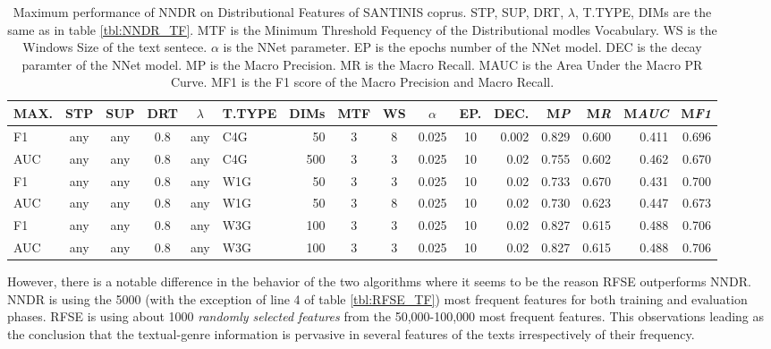 \documentclass[runningheads]{llncs}
\begin{document}
\begin{table}
\center
\begin{tabular}{|l|cccc|lr|ccccr|rrrr|}
\hline
MAX. & STP & SUP & DRT & $\lambda$ & T.TYPE & DIMs & MTF & WS & $\alpha$ & EP. & DEC. & M\emph{P} & M\emph{R} & M\emph{AUC} & M\emph{F1} \\
\hline
F1 & any & any & 0.8 & any & C4G & 50 & 3 & 8 & 0.025 & 10 & 0.002 & 0.829 & 0.600 & 0.411 & 0.696 \\
AUC & any & any & 0.8 & any & C4G & 500 & 3 & 3 & 0.025 & 10 & 0.02 & 0.755 & 0.602 & 0.462 & 0.670 \\
F1 & any & any & 0.8 & any & W1G & 50 & 3 & 3 & 0.025 & 10 & 0.02 & 0.733 & 0.670 & 0.431 & 0.700 \\
AUC & any & any & 0.8 & any & W1G & 50 & 3 & 8 & 0.025 & 10 & 0.02 & 0.730 & 0.623 & 0.447 & 0.673 \\
F1 & any & any & 0.8 & any & W3G & 100 & 3 & 3 & 0.025 & 10 & 0.02 & 0.827 & 0.615 & 0.488 & 0.706 \\
AUC & any & any & 0.8 & any & W3G & 100 & 3 & 3 & 0.025 & 10 & 0.02 & 0.827 & 0.615 & 0.488 & 0.706 \\
\hline
\end{tabular}
\caption {Maximum performance of NNDR on Distributional Features of SANTINIS coprus. STP, SUP, DRT, $\lambda$, T.TYPE, DIMs are the same as in table \ref{tbl:NNDR_TF}. MTF is the Minimum Threshold Fequency of the Distributional modles Vocabulary. WS is the Windows Size of the text sentece. $\alpha$ is the NNet parameter. EP is the epochs number of the NNet model. DEC is the decay paramter of the NNet model. MP is the Macro Precision. MR is the Macro Recall. MAUC is the Area Under the Macro PR Curve. MF1 is the F1 score of the Macro Precision and Macro Recall.}
\label{tbl:NNDR_Gensim}
\vspace{-20mm}
\end{table}

\pagebreak


However, there is a notable difference in the behavior of the two algorithms where it seems to be the reason RFSE outperforms NNDR. NNDR is using the 5000 (with the exception of line 4 of table \ref{tbl:RFSE_TF}) most frequent features for both training and evaluation phases. RFSE is using about 1000 \textit{randomly selected features} from the 50,000-100,000 most frequent features. This observations leading as the conclusion that the textual-genre information is pervasive in several features of the texts irrespectively of their frequency. 
\end{document}
